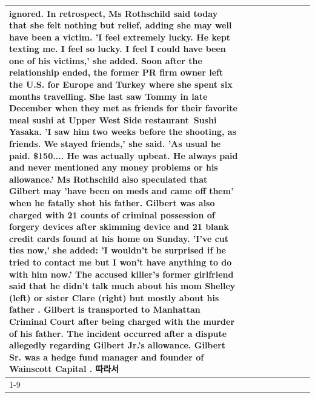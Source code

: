 \begin{table}[H]
\begin{tabular}{lllrlllll}
ignored. In retrospect, Ms Rothschild said today that she felt nothing but relief, adding she may well have been a victim. 'I feel extremely lucky. He kept texting me. I feel so lucky. I feel I could have been one of his victims,' she added. Soon after the relationship ended, the former PR firm owner left the U.S. for Europe and Turkey where she spent six months  travelling. She last saw Tommy in late December when they met as friends for their favorite meal sushi at Upper West Side restaurant Sushi Yasaka. 'I saw him two weeks before the shooting, as friends. We stayed friends,' she said. 'As usual he paid. \$150.... He was actually upbeat. He always paid and never mentioned any money problems or his allowance.' Ms Rothschild also speculated that Gilbert may 'have been on meds and came off them' when he fatally shot his father. Gilbert was also charged with 21 counts of criminal possession of forgery devices after skimming device and 21 blank credit cards found at his home on Sunday. 'I've cut ties now,' she added: 'I wouldn’t be surprised if he tried to contact me but I won’t have anything to do with him now.' The accused killer's former girlfriend said that he didn't talk much about his mom Shelley (left) or sister Clare (right) but mostly about his father . Gilbert is transported to Manhattan Criminal Court  after being charged with the murder of his father. The incident occurred after a dispute allegedly regarding Gilbert Jr.'s allowance. Gilbert Sr. was a hedge fund manager and founder of Wainscott Capital . 따라서 \\
\cline{1-9}

\end{tabular}
\end{table}
